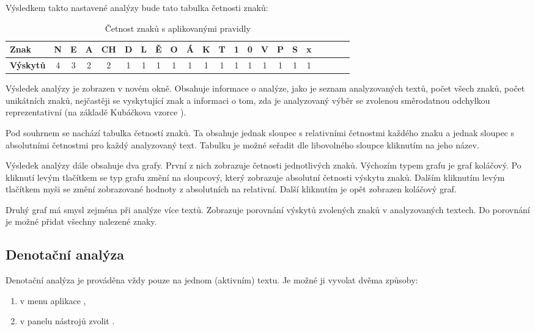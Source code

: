 \documentclass[dp.tex]{subfiles}
\begin{document}
Výsledkem takto nastavené analýzy bude tato tabulka četnosti znaků:

\begin{table}[H]
\caption {Četnost znaků s aplikovanými pravidly} 
\label{tab:title} 
\centering
	\begin{tabular}{|l|c|c|c|c|c|c|c|c|c|c|c|c|c|c|c|c|c|c|c|c|c|}


	\hline \textbf{Znak} & N & E & A & CH & D & L & Ě & O & Á & K & T & 1 & 0 & V & P & S & x \\
	\hline \textbf{Výskytů} & 4 & 3 & 2 & 2 & 1 & 1 & 1 & 1 & 1 & 1 & 1 & 1 & 1 & 1 & 1 & 1 & 1 \\ 
	\hline 
	\end{tabular} 
\end{table} 

Výsledek analýzy je zobrazen v novém okně. Obsahuje informace o analýze, jako je seznam analyzovaných textů, počet všech znaků, počet unikátních znaků, nejčastěji se vyskytující znak a informaci o tom, zda je analyzovaný výběr se zvolenou směrodatnou odchylkou reprezentativní (na základě Kubáčkova vzorce%
). 

Pod souhrnem se nachází tabulka četností znaků. Ta obsahuje jednak sloupec s relativními četnostmi každého znaku a jednak sloupec s absolutními četnostmi pro každý analyzovaný text. Tabulku je možné seřadit dle libovolného sloupce kliknutím na jeho název.

Výsledek analýzy dále obsahuje dva grafy. První z nich zobrazuje četnosti jednotlivých znaků. Výchozím typem grafu je graf koláčový. Po kliknutí levým tlačítkem se typ grafu změní na sloupcový, který zobrazuje absolutní četnosti výskytu znaků. Dalším kliknutím levým tlačítkem myši se změní zobrazované hodnoty z absolutních na relativní. Další kliknutím je opět zobrazen koláčový graf.

Druhý graf má smysl zejména při analýze více textů. Zobrazuje porovnání výskytů zvolených znaků v analyzovaných textech. Do porovnání je možné přidat všechny nalezené znaky.

\subsection{Denotační analýza}

Denotační analýza je prováděna vždy pouze na jednom (aktivním) textu. Je možné ji vyvolat dvěma způsoby:

\begin{enumerate}
\item v menu aplikace ,
\item v panelu nástrojů zvolit .
\end{enumerate}
\end{document}
